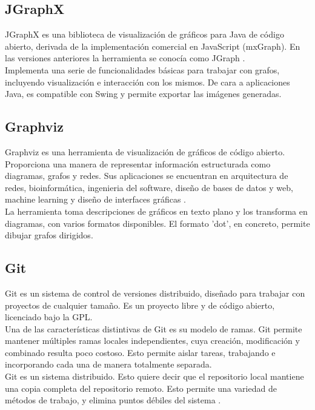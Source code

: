 \subsection{JGraphX}

JGraphX es una biblioteca de visualización de gráficos para Java de código abierto, derivada de la implementación comercial en JavaScript (mxGraph).
En las versiones anteriores la herramienta se conocía como JGraph \cite{website:jgraphx}.
\\
Implementa una serie de funcionalidades básicas para trabajar con grafos, incluyendo visualización e interacción con los mismos.
De cara a aplicaciones Java, es compatible con Swing y permite exportar las imágenes generadas.

\subsection{Graphviz}
Graphviz es una herramienta de visualización de gráficos de código abierto.
Proporciona una manera de representar información estructurada como diagramas, grafos y redes.
Sus aplicaciones se encuentran en arquitectura de redes, bioinformática, ingenieria del software, diseño de bases de datos y web, machine learning y diseño de interfaces gráficas \cite{website:graphviz}.
\\
La herramienta toma descripciones de gráficos en texto plano y los transforma en diagramas, con varios formatos disponibles.
El formato 'dot', en concreto, permite dibujar grafos dirigidos.

\subsection{Git}

Git es un sistema de control de versiones distribuido, diseñado para trabajar con proyectos de cualquier tamaño.
Es un proyecto libre y de código abierto, licenciado bajo la GPL.
\\
Una de las características distintivas de Git es su modelo de ramas.
Git permite mantener múltiples ramas locales independientes, cuya creación, modificación y combinado resulta poco costoso.
Esto permite aislar tareas, trabajando e incorporando cada una de manera totalmente separada.
\\
Git es un sistema distribuido.
Esto quiere decir que el repositorio local mantiene una copia completa del repositorio remoto.
Esto permite una variedad de métodos de trabajo, y elimina puntos débiles del sistema \cite{website:git}.

